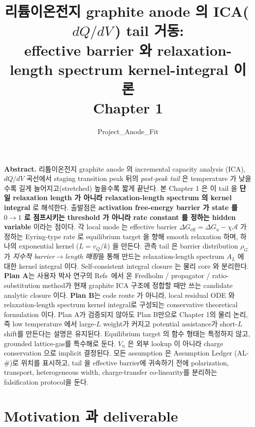 \documentclass[11pt,a4paper]{article}
\title{\textbf{리튬이온전지 graphite anode 의 ICA(\,$dQ/dV$\,) tail 거동:\\
effective barrier 와 relaxation-length spectrum kernel-integral 이론}\\[0.4em]
\large Chapter 1}
\author{Project\_Anode\_Fit}
\date{}
\newcommand{\eff}{\mathrm{eff}}
\begin{document}
\maketitle

\begin{center}\begin{minipage}{0.93\textwidth}
\small \textbf{Abstract.} 리튬이온전지 graphite anode 의 incremental capacity analysis
(ICA), $dQ/dV$ 곡선에서 staging transition peak 뒤의 \emph{post-peak tail} 은 temperature
가 낮을수록 길게 늘어지고(stretched) 높을수록 짧게 끝난다. 본 Chapter 1 은 이 tail 을
\textbf{단일 relaxation length 가 아니라 relaxation-length spectrum 의 kernel integral}
로 해석한다. 출발점은 \textbf{activation free-energy barrier 가 state 를 $0\!\to\!1$ 로
점프시키는 threshold 가 아니라 rate constant 를 정하는 hidden variable} 이라는 점이다.
각 local mode 는 effective barrier $\Delta G_\eff = \Delta G_a-\chi\mathcal A$ 가 정하는
Eyring-type rate 로 equilibrium target 을 향해 smooth relaxation 하며, 하나의 exponential
kernel ($L=v_Q/k$) 을 만든다. 관측 tail 은 barrier distribution $\rho_G$ 가 \emph{지수적
barrier$\to$length 매핑}을 통해 만드는 relaxation-length spectrum $A_L$ 에 대한 kernel
integral 이다. Self-consistent integral closure 는 물리 core 와 분리한다. \textbf{Plan A}는
사용자 박사 연구의 Refs~\cite{lee2011,son2013}에서 온 Fredholm / propagator / ratio-substitution
method가 현재 graphite ICA 구조에 정합할 때만 쓰는 candidate analytic closure 이다.
\textbf{Plan B}는 code route 가 아니라, local residual ODE 와 relaxation-length spectrum
kernel integral로 구성되는 conservative theoretical formulation 이다. Plan A가 검증되지 않아도
Plan B만으로 Chapter 1의 물리 논리, 즉 low temperature 에서 large-$L$ weight가 커지고
potential assistance가 short-$L$ shift를 만든다는 설명은 유지된다. Equilibrium target 의 함수
형태는 특정하지 않고, grounded lattice-gas를 특수해로 둔다. $V_n$ 은 외부 lookup 이 아니라
charge conservation 으로 implicit 결정된다. 모든 assumption 은 Assumption Ledger (AL-\#)로
위치를 표시하고, tail 을 effective barrier에 귀속하기 전에 polarization, transport,
heterogeneous width, charge-transfer co-linearity를 분리하는 falsification protocol을 둔다.
\end{minipage}\end{center}

\tableofcontents
\newpage

\section{Motivation 과 deliverable}\label{sec:intro}
\end{document}
